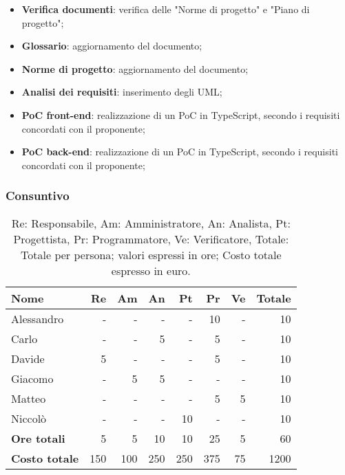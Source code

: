 \begin{itemize}
	\item \textbf{Verifica documenti}: verifica delle "Norme di progetto" e
	      "Piano di progetto";

	\item \textbf{Glossario}: aggiornamento del documento;

	\item \textbf{Norme di progetto}: aggiornamento del documento;

	\item \textbf{Analisi dei requisiti}: inserimento degli UML;

	\item \textbf{PoC front-end}: realizzazione di un PoC in TypeScript, secondo
	      i requisiti concordati con il proponente;

	\item \textbf{PoC back-end}: realizzazione di un PoC in TypeScript, secondo
	      i requisiti concordati con il proponente;
\end{itemize}

\subsubsection{Consuntivo}

\begin{table}[H]
	\centering
	\begin{tabular}{l|r|r|r|r|r|r|r}
		\textbf{Nome}         & \textbf{Re} & \textbf{Am} & \textbf{An} & \textbf{Pt} & \textbf{Pr} & \textbf{Ve} & \textbf{Totale} \\
		\hline
		Alessandro            & -           & -           & -           & -           & 10          & -           & 10              \\
		Carlo                 & -           & -           & 5           & -           & 5           & -           & 10              \\
		Davide                & 5           & -           & -           & -           & 5           & -           & 10              \\
		Giacomo               & -           & 5           & 5           & -           & -           & -           & 10              \\
		Matteo                & -           & -           & -           & -           & 5           & 5           & 10              \\
		Niccolò               & -           & -           & -           & 10          & -           & -           & 10              \\
		\hline
		\textbf{Ore totali}   & 5           & 5           & 10          & 10          & 25          & 5           & 60              \\
		\textbf{Costo totale} & 150         & 100         & 250         & 250         & 375         & 75          & 1200
	\end{tabular}
	\caption{Re: Responsabile, Am: Amministratore, An: Analista, Pt: Progettista,
		Pr: Programmatore, Ve: Verificatore, Totale: Totale per persona; valori espressi in ore; Costo totale espresso in euro.}
\end{table}

